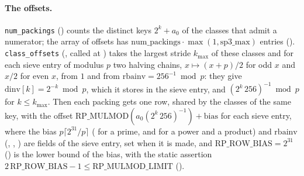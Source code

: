 \paragraph{The offsets.} \verb|num_packings| () counts the
distinct keys $2^k + a_0$ of the classes that admit a numerator; the array of offsets has
$\mathrm{num\_packings} \cdot \max(1, \mathrm{sp3\_max})$ entries
(). \verb|class_offsets| (,
called at ) takes the largest stride $k_{\max}$ of these classes
and for each sieve entry of modulus $p$ two halving chains, $x \mapsto (x + p)/2$ for odd $x$ and
$x/2$ for even $x$, from $1$ and from $\mathrm{rbainv} = 256^{-1} \bmod p$: they give
$\mathrm{dinv}[k] = 2^{-k} \bmod p$, which it stores in the sieve entry, and
$(2^k\, 256)^{-1} \bmod p$ for $k \le k_{\max}$. Then each packing gets one row, shared by the
classes of the same key, with the offset $\mathrm{RP\_MULMOD}(a_0 (2^k\, 256)^{-1}) + \mathrm{bias}$
for each sieve entry, where the bias $p \lceil 2^{31} / p \rceil$
( for a prime,  and
 for a power and a product) and $\mathrm{rbainv}$
(, ,
) are fields of the sieve entry, set when it is made, and
$\mathrm{RP\_ROW\_BIAS} = 2^{31}$ () is the lower bound of the bias,
with the static assertion $2\,\mathrm{RP\_ROW\_BIAS} - 1 \le \mathrm{RP\_MULMOD\_LIMIT}$
().

